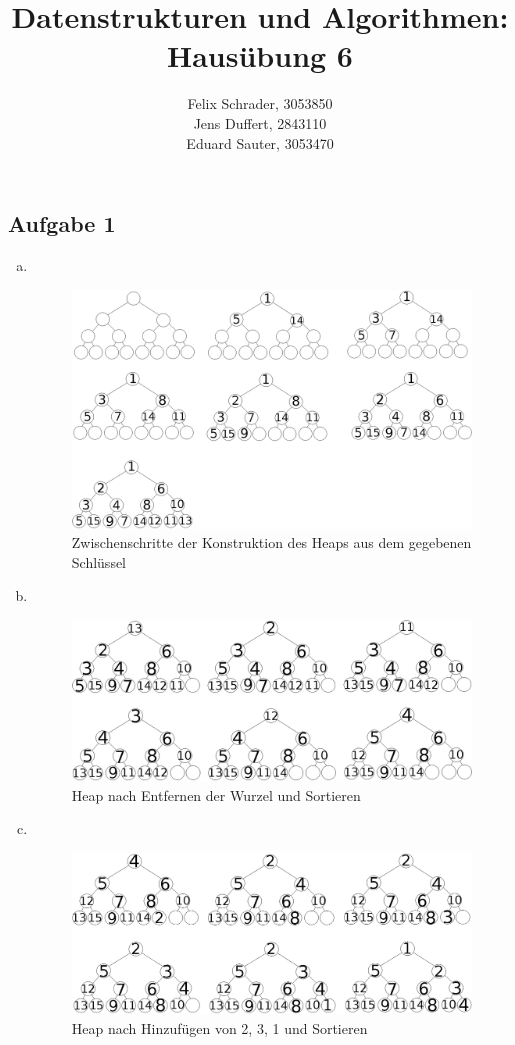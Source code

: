 \documentclass[11pt]{article}
\author{
  Felix Schrader, 3053850 \\ 
  Jens Duffert, 2843110 \\
  Eduard Sauter, 3053470
}
\title{Datenstrukturen und Algorithmen: Haus\"ubung 6}
\begin{document}
\maketitle
\subsection*{Aufgabe 1}
\begin{enumerate}[a)]
  \item $ $
    \begin{figure}[h!]
      \centering
      \includegraphics[width=\textwidth]{a1a_trees}
      \caption{Zwischenschritte der Konstruktion des Heaps aus dem gegebenen Schlüssel}
    \end{figure}
  \item $ $
    \begin{figure}[h!]
      \centering
      \includegraphics[width=\textwidth]{a1b_trees}
      \caption{Heap nach Entfernen der Wurzel und Sortieren}
    \end{figure}
    \pagebreak
  \item $ $
    \begin{figure}[h!]
      \centering
      \includegraphics[width=\textwidth]{a1c_trees}
      \caption{Heap nach Hinzufügen von 2, 3, 1 und Sortieren}
    \end{figure}
\end{enumerate}
\newpage
\end{document}
